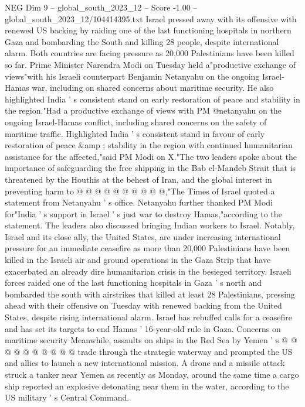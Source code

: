\begin{textsample}{NEG Dim 9 – global\_south\_2023\_12 – Score -1.00 – global\_south\_2023\_12/104414395.txt}  \label{ex:f9_neg_440}
Israel pressed away with its offensive with renewed US backing by raiding one of the last functioning hospitals in northern Gaza and bombarding the South and killing 28 people, despite international alarm.
Both countries are facing pressure as 20,000 Palestinians have been killed so far.
Prime Minister Narendra Modi on Tuesday held a"productive exchange of views"with his Israeli counterpart Benjamin Netanyahu on the ongoing Israel-Hamas war, including on shared concerns about maritime security.
He also highlighted India ' s consistent stand on early restoration of peace and stability in the region."Had a productive exchange of views with PM @netanyahu on the ongoing Israel-Hamas conflict, including shared concerns on the safety of maritime traffic.
Highlighted India ' s consistent stand in favour of early restoration of peace \&amp ; stability in the region with continued humanitarian assistance for the affected,"said PM Modi on X."The two leaders spoke about the importance of safeguarding the free shipping in the Bab el-Mandeb Strait that is threatened by the Houthis at the behest of Iran, and the global interest in preventing harm to @ @ @ @ @ @ @ @ @ @,"The Times of Israel quoted a statement from Netanyahu ' s office.
Netanyahu further thanked PM Modi for"India ' s support in Israel ' s just war to destroy Hamas,"according to the statement.
The leaders also discussed bringing Indian workers to Israel.
Notably, Israel and its close ally, the United States, are under increasing international pressure for an immediate ceasefire as more than 20,000 Palestinians have been killed in the Israeli air and ground operations in the Gaza Strip that have exacerbated an already dire humanitarian crisis in the besieged territory.
Israeli forces raided one of the last functioning hospitals in Gaza ' s north and bombarded the south with airstrikes that killed at least 28 Palestinians, pressing ahead with their offensive on Tuesday with renewed backing from the United States, despite rising international alarm.
Israel has rebuffed calls for a ceasefire and has set its targets to end Hamas ' 16-year-old rule in Gaza.
Concerns on maritime security Meanwhile, assaults on ships in the Red Sea by Yemen ' s @ @ @ @ @ @ @ @ @ @ trade through the strategic waterway and prompted the US and allies to launch a new international mission.
A drone and a missile attack struck a tanker near Yemen as recently as Monday, around the same time a cargo ship reported an explosive detonating near them in the water, according to the US military ' s Central Command.

\end{textsample}
